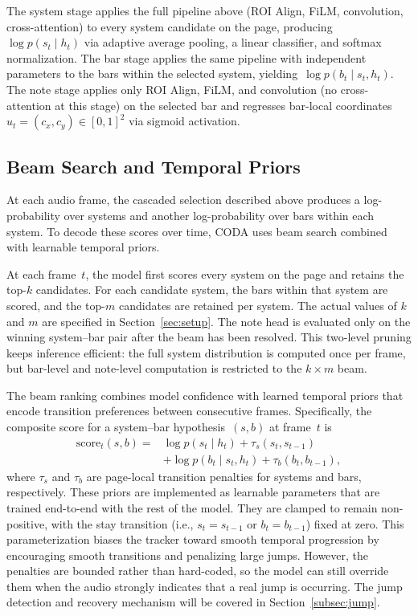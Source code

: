 \documentclass{article}
\begin{document}
The system stage applies the full pipeline above (ROI Align, FiLM, convolution, cross-attention) to every system candidate on the page, producing~$\log p(s_t \mid h_t)$ via adaptive average pooling, a linear classifier, and softmax normalization. The bar stage applies the same pipeline with independent parameters to the bars within the selected system, yielding~$\log p(b_t \mid s_t, h_t)$. The note stage applies only ROI Align, FiLM, and convolution (no cross-attention at this stage) on the selected bar and regresses bar-local coordinates~$u_t = (c_x, c_y) \in [0,1]^2$ via sigmoid activation.

\subsection{Beam Search and Temporal Priors}

At each audio frame, the cascaded selection described above produces a log-probability over systems and another log-probability over bars within each system. To decode these scores over time, CODA uses beam search combined with learnable temporal priors.

At each frame~$t$, the model first scores every system on the page and retains the top-$k$ candidates. For each candidate system, the bars within that system are scored, and the top-$m$ candidates are retained per system. The actual values of $k$ and $m$ are specified in Section~\ref{sec:setup}. The note head is evaluated only on the winning system--bar pair after the beam has been resolved. This two-level pruning keeps inference efficient: the full system distribution is computed once per frame, but bar-level and note-level computation is restricted to the $k \times m$ beam.

The beam ranking combines model confidence with learned temporal priors that encode transition preferences between consecutive frames. Specifically, the composite score for a system--bar hypothesis~$(s, b)$ at frame~$t$ is
\begin{equation}
\begin{split}
\mathrm{score}_t(s,b) = {} & \log p(s_t \mid h_t) + \tau_s(s_t, s_{t-1}) \\
& + \log p(b_t \mid s_t, h_t) + \tau_b(b_t, b_{t-1}),
\end{split}
\end{equation}
where $\tau_s$ and $\tau_b$ are page-local transition penalties for systems and bars, respectively. These priors are implemented as learnable parameters that are trained end-to-end with the rest of the model. They are clamped to remain non-positive, with the stay transition (i.e., $s_t = s_{t-1}$ or $b_t = b_{t-1}$) fixed at zero. This parameterization biases the tracker toward smooth temporal progression by encouraging smooth transitions and penalizing large jumps. However, the penalties are bounded rather than hard-coded, so the model can still override them when the audio strongly indicates that a real jump is occurring. The jump detection and recovery mechanism will be covered in Section~\ref{subsec:jump}.
\end{document}

